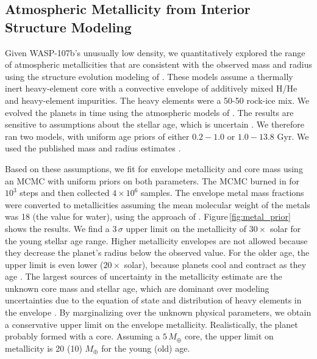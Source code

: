 \documentclass[twocolumn, trackchanges]{aastex61}
\begin{document}
\subsection{Atmospheric Metallicity from Interior Structure Modeling}
\label{sec:interior}
Given WASP-107b's unusually low density, we quantitatively explored the range of atmospheric metallicities that are consistent with the observed mass and radius using the structure evolution modeling of \cite{thorngren16}.  These models assume a thermally inert heavy-element core with a convective envelope of additively mixed H/He \citep{saumon95} and heavy-element impurities.  The heavy elements were a 50-50 rock-ice mix. We evolved the planets in time using the atmospheric models of \cite{fortney07}.  The results are sensitive to assumptions about the stellar age, which is uncertain \citep[either $0.6\pm0.2$ to $8.3\pm4.3$ Gyr depending on model assumptions;][]{mocnik17}. We therefore ran two models, with uniform age priors of either $0.2-1.0$ or $1.0-13.8$ Gyr.  We used the published mass and radius estimates \citep[$0.12\pm0.01\,M_\mathrm{J}$, $0.94\pm0.02$;][]{anderson17}.  %

Based on these assumptions, we fit for envelope metallicity and core mass using an MCMC with uniform priors on both parameters.  The MCMC burned in for $10^3$ steps and then collected $4\times10^6$ samples.  The envelope metal mass fractions were converted to metallicities assuming the mean molecular weight of the metals was 18 (the value for water), using the approach of \cite{fortney13}. Figure\,\ref{fig:metal_prior} shows the results.  We find a $3\,\sigma$ upper limit on the metallicity of $30\times$ solar for the young stellar age range.  Higher metallicity envelopes are not allowed because they decrease the planet's radius below the observed value.  For the older age, the upper limit is even lower ($20\times$ solar), because planets cool and contract as they age \citep{fortney08}.  The largest sources of uncertainty in the metallicity estimate are the unknown core mass and stellar age, which are dominant over modeling uncertainties due to the equation of state and distribution of heavy elements in the envelope \citep{thorngren16}. By marginalizing over the unknown physical parameters, we obtain a conservative upper limit on the envelope metallicity.  Realistically, the planet probably formed with a core. Assuming a $5\,M_\oplus$ core, the upper limit on metallicity is 20 (10) $M_\oplus$ for the young (old) age.  
\end{document}
